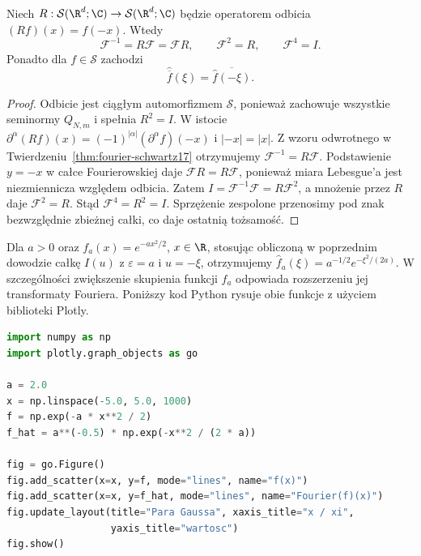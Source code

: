 \begin{wniosek}
\label{cor:dt-fourier-iteration}
Niech $R:\mathcal S(\R^d;\C)\to\mathcal S(\R^d;\C)$
będzie operatorem odbicia $(Rf)(x)=f(-x)$.
Wtedy
\[
 \mathcal F^{-1}=R\mathcal F=\mathcal F R,\qquad
 \mathcal F^2=R,\qquad \mathcal F^4=I.
\]
Ponadto dla $f\in\mathcal S$ zachodzi
\[
 \widehat{\overline f}(\xi)=\overline{\widehat f(-\xi)}.
\]
\end{wniosek}
\begin{proof}
Odbicie jest ciągłym automorfizmem $\mathcal S$,
ponieważ zachowuje wszystkie seminormy $Q_{N,m}$
i spełnia $R^2=I$. W istocie
$\partial^\alpha(Rf)(x)=(-1)^{|\alpha|}(\partial^\alpha f)(-x)$
i $|-x|=|x|$.
Z wzoru odwrotnego w Twierdzeniu~\ref{thm:fourier-schwartz17}
otrzymujemy $\mathcal F^{-1}=R\mathcal F$.
Podstawienie $y=-x$ w całce Fourierowskiej daje
$\mathcal F R=R\mathcal F$, ponieważ miara Lebesgue'a
jest niezmiennicza względem odbicia. Zatem
$I=\mathcal F^{-1}\mathcal F=R\mathcal F^2$,
a mnożenie przez $R$ daje $\mathcal F^2=R$.
Stąd $\mathcal F^4=R^2=I$.
Sprzężenie zespolone przenosimy pod znak bezwzględnie
zbieżnej całki, co daje ostatnią tożsamość.
\end{proof}

\begin{przyklad}
\label{ex:fourier-gauss17}
Dla $a>0$ oraz $f_a(x)=e^{-ax^2/2}$, $x\in\R$,
stosując obliczoną w poprzednim dowodzie całkę $I(u)$
z $\varepsilon=a$ i $u=-\xi$, otrzymujemy
$\widehat f_a(\xi)=a^{-1/2}e^{-\xi^2/(2a)}$.
W szczególności zwiększenie skupienia funkcji $f_a$
odpowiada rozszerzeniu jej transformaty Fouriera.
Poniższy kod Python rysuje obie funkcje z użyciem biblioteki Plotly.
\begin{lstlisting}[language=Python,caption={Para funkcji Gaussa: funkcja i transformata Fouriera}]
import numpy as np
import plotly.graph_objects as go

a = 2.0
x = np.linspace(-5.0, 5.0, 1000)
f = np.exp(-a * x**2 / 2)
f_hat = a**(-0.5) * np.exp(-x**2 / (2 * a))

fig = go.Figure()
fig.add_scatter(x=x, y=f, mode="lines", name="f(x)")
fig.add_scatter(x=x, y=f_hat, mode="lines", name="Fourier(f)(x)")
fig.update_layout(title="Para Gaussa", xaxis_title="x / xi",
                  yaxis_title="wartosc")
fig.show()
\end{lstlisting}
\end{przyklad}

